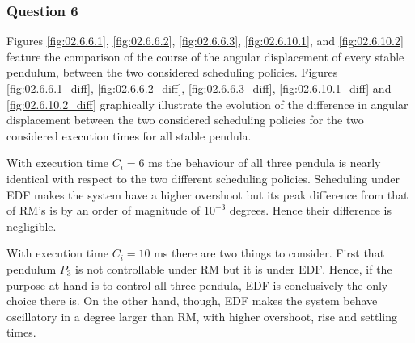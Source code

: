 \subsubsection{Question 6}

Figures \ref{fig:02.6.6.1}, \ref{fig:02.6.6.2}, \ref{fig:02.6.6.3},
\ref{fig:02.6.10.1}, and \ref{fig:02.6.10.2} feature the comparison of the
course of the angular displacement of every stable pendulum, between the two
considered scheduling policies. Figures \ref{fig:02.6.6.1_diff},
\ref{fig:02.6.6.2_diff}, \ref{fig:02.6.6.3_diff}, \ref{fig:02.6.10.1_diff} and
\ref{fig:02.6.10.2_diff} graphically illustrate the evolution of the difference
in angular displacement between the two considered scheduling policies for the
two considered execution times for all stable pendula.

With execution time $C_i = 6$ ms the behaviour of all three pendula is nearly
identical with respect to the two different scheduling policies. Scheduling
under EDF makes the system have a higher overshoot but its peak difference from
that of RM's is by an order of magnitude of $10^{-3}$ degrees. Hence their
difference is negligible.

With execution time $C_i = 10$ ms there are two things to consider. First that
pendulum $P_3$ is not controllable under RM but it is under EDF. Hence, if the
purpose at hand is to control all three pendula, EDF is conclusively the only
choice there is. On the other hand, though, EDF makes the system behave
oscillatory in a degree larger than RM, with higher overshoot, rise and settling
times.

\noindent{}

